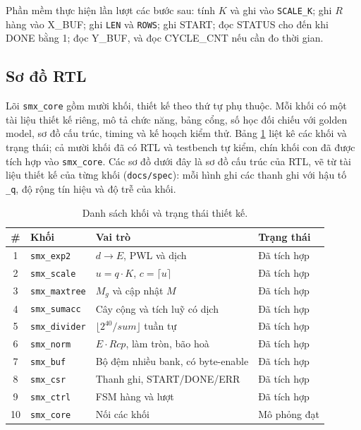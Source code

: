 Phần mềm thực hiện lần lượt các bước sau: tính $K$ và ghi vào \texttt{SCALE\_K}; ghi $R$ hàng vào X\_BUF; ghi \texttt{LEN} và \texttt{ROWS}; ghi START; đọc STATUS cho đến khi DONE bằng 1; đọc Y\_BUF, và đọc CYCLE\_CNT nếu cần đo thời gian.

\subsection{Sơ đồ RTL}
\label{sec:rtl}

Lõi \texttt{smx\_core} gồm mười khối, thiết kế theo thứ tự phụ thuộc. Mỗi khối có một tài liệu thiết kế riêng, mô tả chức năng, bảng cổng, số học đối chiếu với golden model, sơ đồ cấu trúc, timing và kế hoạch kiểm thử. Bảng \ref{tab:blocks} liệt kê các khối và trạng thái; cả mười khối đã có RTL và testbench tự kiểm, chín khối con đã được tích hợp vào \texttt{smx\_core}. Các sơ đồ dưới đây là sơ đồ cấu trúc của RTL, vẽ từ tài liệu thiết kế của từng khối (\texttt{docs/spec}): mỗi hình ghi các thanh ghi với hậu tố \texttt{\_q}, độ rộng tín hiệu và độ trễ của khối.

\begin{table}[htbp]
\centering
\begin{tabular}{clll}
\toprule
\# & Khối & Vai trò & Trạng thái \\
\midrule
1  & \texttt{smx\_exp2}    & $d \to E$, PWL và dịch & Đã tích hợp \\
2  & \texttt{smx\_scale}   & $u = q \cdot K$, $c = \lceil u \rceil$ & Đã tích hợp \\
3  & \texttt{smx\_maxtree} & $M_g$ và cập nhật $M$ & Đã tích hợp \\
4  & \texttt{smx\_sumacc}  & Cây cộng và tích luỹ có dịch & Đã tích hợp \\
5  & \texttt{smx\_divider} & $\lfloor 2^{40} / \mathit{sum} \rfloor$ tuần tự & Đã tích hợp \\
6  & \texttt{smx\_norm}    & $E \cdot \mathit{Rcp}$, làm tròn, bão hoà & Đã tích hợp \\
7  & \texttt{smx\_buf}     & Bộ đệm nhiều bank, có byte-enable & Đã tích hợp \\
8  & \texttt{smx\_csr}     & Thanh ghi, START/DONE/ERR & Đã tích hợp \\
9  & \texttt{smx\_ctrl}    & FSM hàng và lượt & Đã tích hợp \\
10 & \texttt{smx\_core}    & Nối các khối & Mô phỏng đạt \\
\bottomrule
\end{tabular}
\caption{Danh sách khối và trạng thái thiết kế.}
\label{tab:blocks}
\end{table}


